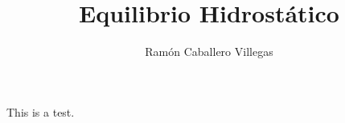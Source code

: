 \documentclass{report}
\author{Ramón Caballero Villegas}
\title{Equilibrio Hidrostático}
\begin{document}
\maketitle
This is a test. \citet*{smithReview}


\end{document}
